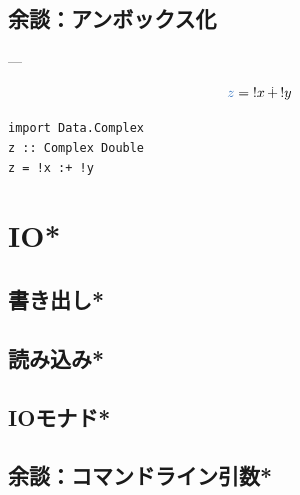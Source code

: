 \documentclass[a5paper,twoside,fleqn,draft]{jsbook}
\begin{document}
\section{余談：アンボックス化}




---


\begin{equation}
\hVar{z}={}!x{}\mComplexPlus{}!y
\end{equation}

\begin{haskellcode}
\begin{verbatim}
import Data.Complex
z :: Complex Double
z = !x :+ !y
\end{verbatim}
\end{haskellcode}


\chapter{IO*}
\label{ch:more-io}

\section{書き出し*}
\section{読み込み*}
\section{IOモナド*}

\section{余談：コマンドライン引数*}
\end{document}
